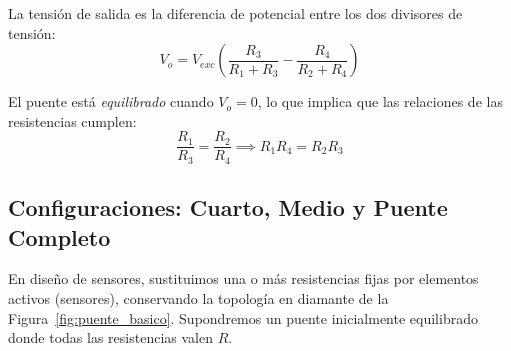 \begin{marginfigure}
    \centering
    \shorthandoff{>}
    \caption[Topología en diamante del puente de Wheatstone.]{Topología en diamante del puente de Wheatstone. La medida diferencial $V_o = V_a - V_b$ elimina el modo común de la señal.}\label{fig:puente_basico}
\end{marginfigure}

La tensión de salida es la diferencia de potencial entre los dos divisores de tensión:
\begin{equation}\label{eq:v_out_puente}
    V_o = V_{exc} \left( \frac{R_3}{R_1 + R_3} - \frac{R_4}{R_2 + R_4} \right)
\end{equation}

El puente está \emph{equilibrado} cuando $V_o = 0$, lo que implica que las relaciones de las resistencias cumplen:
\begin{equation}
    \frac{R_1}{R_3} = \frac{R_2}{R_4} \implies R_1 R_4 = R_2 R_3
\end{equation}

\subsection{Configuraciones: Cuarto, Medio y Puente Completo}

En diseño de sensores, sustituimos una o más resistencias fijas por elementos activos (sensores), conservando la topología en diamante de la Figura~\ref{fig:puente_basico}. Supondremos un puente inicialmente equilibrado donde todas las resistencias valen $R$.

